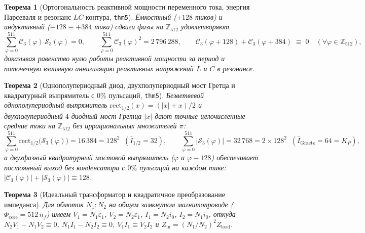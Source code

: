 \documentclass[11pt,a4paper]{article}
\newtheorem{theorem}{Теорема}[section]
\theoremstyle{definition}
\theoremstyle{remark}
\begin{document}
\begin{theorem}[Ортогональность реактивной мощности переменного тока, энергия Парсеваля и резонанс $LC$-контура, \texttt{thm5}]
\label{thm:ac-rlc-laws}
Ёмкостный ($+128$ тиков) и индуктивный ($-128 \equiv +384$ тика) сдвиги фазы на $\mathbb{Z}_{512}$ удовлетворяют
\begin{equation}
  \label{eq:ac-rlc-laws}
  \sum_{\varphi=0}^{511} \mathcal{C}_3(\varphi)\,\mathcal{S}_3(\varphi) = 0, \qquad
  \sum_{\varphi=0}^{511} \mathcal{C}_3(\varphi)^2 = 2\,796\,288, \qquad
  \mathcal{C}_3(\varphi + 128) + \mathcal{C}_3(\varphi + 384) \;\equiv\; 0 \quad (\forall\varphi\in\mathbb{Z}_{512}),
\end{equation}
доказывая равенство нулю работы реактивной мощности за период и поточечную взаимную аннигиляцию реактивных напряжений $L$ и $C$ в резонансе.
\end{theorem}

\begin{theorem}[Однополупериодный диод, двухполупериодный мост Гретца и квадратурный выпрямитель с $0\%$ пульсаций, \texttt{thm5}]
\label{thm:rectifiers}
Безветвевой однополупериодный выпрямитель $\mathrm{rect}_{1/2}(x) = (|x|+x)/2$ и двухполупериодный $4$-диодный мост Гретца $|x|$ дают точные целочисленные средние токи на $\mathbb{Z}_{512}$ без иррациональных множителей $\pi$:
\begin{equation}
  \label{eq:rectifiers}
  \sum_{\varphi=0}^{511}\mathrm{rect}_{1/2}\bigl(\mathcal{S}_3(\varphi)\bigr) = 16\,384 = 128^2 \;\;(\bar{I}_{1/2} = 32), \qquad
  \sum_{\varphi=0}^{511}\bigl|\mathcal{S}_3(\varphi)\bigr| = 32\,768 = 2\times 128^2 \;\;(\bar{I}_{\mathrm{Graetz}} = 64 = K_P),
\end{equation}
а двухфазный квадратурный мостовой выпрямитель ($\varphi$ и $\varphi - 128$) обеспечивает постоянный выход без конденсатора с $0\%$ пульсаций на каждом тике: $|\mathcal{C}_3(\varphi)| + |\mathcal{S}_3(\varphi)| \equiv 128$.
\end{theorem}

\begin{theorem}[Идеальный трансформатор и квадратичное преобразование импеданса]
\label{thm:transformer}
Для обмоток $N_1 : N_2$ на общем замкнутом магнитопроводе ($\Phi_{\mathrm{core}} = 512\,n_f$) имеем $V_1 = N_1\varepsilon_1$, $V_2 = N_2\varepsilon_1$, $I_1 = N_2 i_0$, $I_2 = N_1 i_0$, откуда $N_2 V_1 - N_1 V_2 \equiv 0$, $N_1 I_1 - N_2 I_2 \equiv 0$, $V_1 I_1 \equiv V_2 I_2$ и $Z_{\mathrm{in}} = (N_1/N_2)^2 Z_{\mathrm{load}}$.
\end{theorem}
\end{document}
